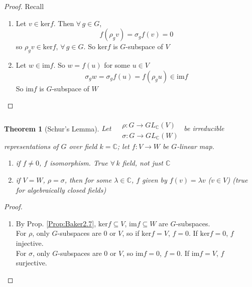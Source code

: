\documentclass[10pt]{amsart}
\newtheorem{theorem}{Theorem}
\begin{document}
\begin{multicols*}{2}
\begin{proof}
Recall 

\begin{enumerate}
\item[(a)] Let $v\in \text{ker}{f}$.  Then $\forall \, g \in G$, 
\[
f(\rho_g v) = \sigma_g f(v) = 0 
\]
so $\rho_g v \in \text{ker}{f}$, $\forall \, g \in G$.  So $\text{ker}{f}$ is $G$-subspace of $V$
\item[(b)] Let $w\in \text{im}{f}$.  So $w = f(u)$ for some $u \in V$ 
\[
\sigma_g w = \sigma_g f(u) = f(\rho_gu) \in \text{im}f
\]
So $\text{im}{f}$ is $G$-subspace of $W$
\end{enumerate}
\end{proof}

\begin{theorem}[Schur's Lemma]
Let $\begin{aligned} & \quad \\
  & \rho : G \to GL_{\mathbb{C}}(V) \\
  & \sigma : G \to GL_{\mathbb{C}}(W) \end{aligned}$ be irreducible representations of $G$ over field $k= \mathbb{C}$; let $f:V \to W$ be $G$-linear map.  

\begin{enumerate}
  \item[(a)] if $f\neq 0$, $f$ isomorphism.  True $\forall \, k$ field, not just $\mathbb{C}$
  \item[(b)] if $V=W$, $\rho = \sigma$, then for some $\lambda \in \mathbb{C}$, $f$ given by $f(v) = \lambda v$ ($v\in V$) (true for algebraically closed fields)
\end{enumerate}
\end{theorem}

\begin{proof}
\begin{enumerate}
\item[(a)] By Prop. \ref{Prop:Baker2.7}, $\text{ker}f \subseteq V$, $\text{im}f \subseteq W$ are $G$-subspaces.  \\
For $\rho$, only $G$-subspaces are $0$ or $V$, so if $\text{ker}f = V$, $f=0$.  If $\text{ker}f = 0$, $f$ injective.  \\
For $\sigma$, only $G$-subspaces are $0$ or $V$, so $\text{im}f =0 $, $f=0$.  If $\text{im}f =V$, $f$ surjective.  


\end{enumerate}
\end{proof}
\end{multicols*}
\end{document}
